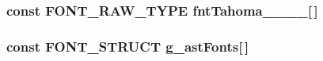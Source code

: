 \subsubsection[{fntTahoma\_\-12\_\-0\_\-0\_\-0}]{\setlength{\rightskip}{0pt plus 5cm}const FONT\_\-RAW\_\-TYPE {\bf fntTahoma\_\_\_\_}[$\,$]}\label{font__table_8h_a82c056098eb55fa36c9e5c127d653145}
\subsubsection[{g\_\-astFonts}]{\setlength{\rightskip}{0pt plus 5cm}const {\bf FONT\_\-STRUCT} {\bf g\_\-astFonts}[$\,$]}\label{font__table_8h_ad8057d150027e7db3f3ed65b70c6c910}
